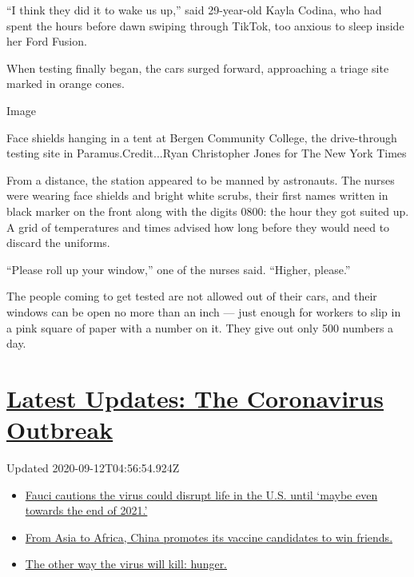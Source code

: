 ``I think they did it to wake us up,'' said 29-year-old Kayla Codina,
who had spent the hours before dawn swiping through TikTok, too anxious
to sleep inside her Ford Fusion.

When testing finally began, the cars surged forward, approaching a
triage site marked in orange cones.

Image

Face shields hanging in a tent at Bergen Community College, the
drive-through testing site in Paramus.Credit...Ryan Christopher Jones
for The New York Times

From a distance, the station appeared to be manned by astronauts. The
nurses were wearing face shields and bright white scrubs, their first
names written in black marker on the front along with the digits 0800:
the hour they got suited up. A grid of temperatures and times advised
how long before they would need to discard the uniforms.

``Please roll up your window,'' one of the nurses said. ``Higher,
please.''

The people coming to get tested are not allowed out of their cars, and
their windows can be open no more than an inch --- just enough for
workers to slip in a pink square of paper with a number on it. They give
out only 500 numbers a day.

\hypertarget{latest-updates-the-coronavirus-outbreak}{%
\section{\texorpdfstring{\href{https://www.nytimes3xbfgragh.onion/2020/09/11/world/covid-19-coronavirus.html?action=click\&pgtype=Article\&state=default\&region=MAIN_CONTENT_1\&context=storylines_live_updates}{Latest
Updates: The Coronavirus
Outbreak}}{Latest Updates: The Coronavirus Outbreak}}\label{latest-updates-the-coronavirus-outbreak}}

Updated 2020-09-12T04:56:54.924Z

\begin{itemize}
\tightlist
\item
  \href{https://www.nytimes3xbfgragh.onion/2020/09/11/world/covid-19-coronavirus.html?action=click\&pgtype=Article\&state=default\&region=MAIN_CONTENT_1\&context=storylines_live_updates\#link-dfb8a16}{Fauci
  cautions the virus could disrupt life in the U.S. until `maybe even
  towards the end of 2021.'}
\item
  \href{https://www.nytimes3xbfgragh.onion/2020/09/11/world/covid-19-coronavirus.html?action=click\&pgtype=Article\&state=default\&region=MAIN_CONTENT_1\&context=storylines_live_updates\#link-7104d154}{From
  Asia to Africa, China promotes its vaccine candidates to win friends.}
\item
  \href{https://www.nytimes3xbfgragh.onion/2020/09/11/world/covid-19-coronavirus.html?action=click\&pgtype=Article\&state=default\&region=MAIN_CONTENT_1\&context=storylines_live_updates\#link-393ad215}{The
  other way the virus will kill: hunger.}
\end{itemize}


